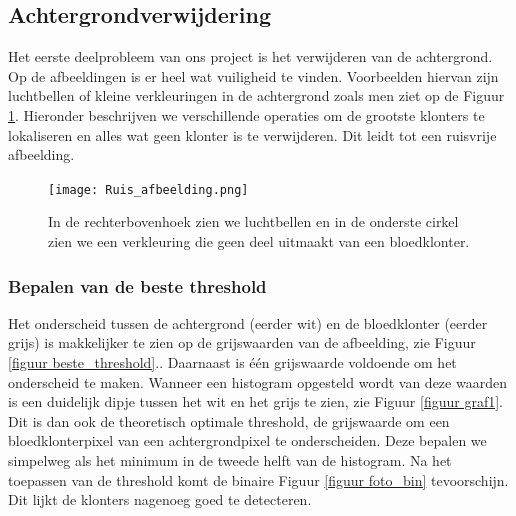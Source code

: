 \documentclass[a4paper,kulak]{kulakarticle}
\begin{document}
\subsection{Achtergrondverwijdering}
Het eerste deelprobleem van ons project is het verwijderen van de achtergrond. Op de afbeeldingen is er heel wat vuiligheid te vinden. Voorbeelden hiervan zijn luchtbellen of kleine verkleuringen in de achtergrond zoals men ziet op de Figuur \ref{figuur achtergrondverwijdering}. Hieronder beschrijven we verschillende operaties om de grootste klonters te lokaliseren en alles wat geen klonter is te verwijderen. Dit leidt tot een ruisvrije afbeelding.

\begin{figure}[H]
	\centering
	\texttt{[image: Ruis\_afbeelding.png]}	
	\caption{In de rechterbovenhoek zien we luchtbellen en in de onderste cirkel zien we een verkleuring die geen deel uitmaakt van een bloedklonter.}
	\label{figuur achtergrondverwijdering}
\end{figure}

\subsubsection{Bepalen van de beste threshold}
Het onderscheid tussen de achtergrond (eerder wit) en de bloedklonter (eerder grijs) is makkelijker te zien op de grijswaarden van de afbeelding, zie Figuur \ref{figuur beste_threshold}.. Daarnaast is één grijswaarde voldoende om het onderscheid te maken. Wanneer een histogram opgesteld wordt van deze waarden is een duidelijk dipje tussen het wit en het grijs te zien, zie Figuur \ref{figuur graf1}. Dit is dan ook de theoretisch optimale threshold, de grijswaarde om een bloedklonterpixel van een achtergrondpixel te onderscheiden. Deze bepalen we simpelweg als het minimum in de tweede helft van de histogram. Na het toepassen van de threshold komt de binaire Figuur \ref{figuur foto_bin} tevoorschijn. Dit lijkt de klonters nagenoeg goed te detecteren.
\end{document}
